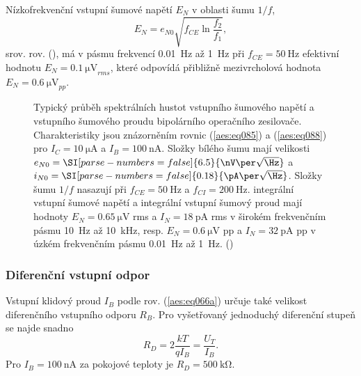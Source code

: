         Nízkofrekvenční vstupní šumové napětí \(E_N\) v oblasti šumu \(1/f\),
        \begin{equation}\label{aes:eq087}
          E_N = e_{N0}\sqrt{f_{CE}\ln{\dfrac{f_2}{f_1}}},
        \end{equation}
        srov. rov. (), má v pásmu frekvencí \qty{0.01}{\Hz} až \qty{1}{\Hz} při \(f_{CE}
        = \qty{50}{\Hz}\) efektivní hodnotu \(E_N = \qty{0.1}{\uV}_{rms}\), které odpovídá přibližně
        mezivrcholová hodnota \(E_N = \qty{0.6}{\uV}_{pp}\).

        \begin{figure}[ht!] %
          \centering
          \caption{Typický průběh spektrálních hustot vstupního šumového napětí a vstupního šumového
                   proudu bipolárního operačního zesilovače. Charakteristiky jsou znázorněním rovnic
                   (\ref{aes:eq085}) a (\ref{aes:eq088}) pro \(I_C = \qty{10}{\uA}\)
                   a \(I_B = \qty{100}{\nA}\). Složky bílého šumu mají velikosti
                   \(e_{N0} = \SI[parse-numbers =
                   false]{6.5}{\nV\per\sqrt{\Hz}}\) a \(i_{N0} =
                   \SI[parse-numbers =
                   false]{0.18}{\pA\per\sqrt{\Hz}}\). Složky šumu
                   \(1/f\) nasazují při \(f_{CE} = \qty{50}{\Hz}\) a \(f_{CI} =
                   \qty{200}{\Hz}\). integrální vstupní šumové napětí a integrální
                   vstupní šumový proud mají hodnoty \(E_N = \qty{0.65}{\uV}\) rms a
                   \(I_N = \qty{18}{\pA}\) rms v širokém frekvenčním pásmu
                   \qty{10}{\Hz} až \qty{10}{\kHz}, resp. \(E_N =
                   \qty{0.6}{\uV}\)  pp a \(I_N = \qty{32}{\pA}\) pp v
                   úzkém frekvenčním pásmu \qty{0.01}{\Hz} až
                   \qty{1}{\Hz}. (\cite[s.~54]{Dostal})}
          \label{aes:fig064}
        \end{figure}

      \subsubsection{Diferenční vstupní odpor}\label{aesIchIIIsecIIIssecXI}  
      Vstupní klidový proud \(I_B\) podle rov. (\ref{aes:eq066a}) určuje také velikost diferenčního
      vstupního odporu \(R_B\). Pro vyšetřovaný jednoduchý diferenční stupeň se najde snadno
      \begin{equation}\label{aes:eq088}
        R_D = 2\dfrac{kT}{qI_B} = \dfrac{U_T}{I_B}.
      \end{equation}
      Pro \(I_B = \qty{100}{\nA}\) za pokojové teploty je \(R_D = \qty{500}{\kilo\ohm}\).
      
